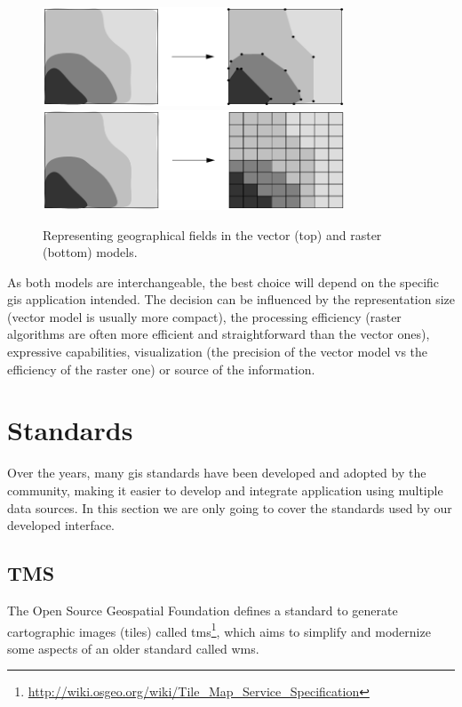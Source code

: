     \begin{figure}[ht]
		\begin{center}
			{\includegraphics[width=0.8\textwidth]{figures/field_vector.png}}
			{\includegraphics[width=0.8\textwidth]{figures/field_raster.png}}
		\end{center}
		\caption{Representing geographical fields in the vector (top) and raster (bottom) models.}
		\label{fig:gis:field}
	\end{figure}
    
    As both models are interchangeable, the best choice will depend on the specific \gls{gis} application intended. The decision can be influenced by the representation size (vector model is usually more compact), the processing efficiency (raster algorithms are often more efficient and straightforward than the vector ones), expressive capabilities, visualization (the precision of the vector model vs the efficiency of the raster one) or source of the information.
    
    \section{Standards}
    Over the years, many \gls{gis} standards have been developed and adopted by the community, making it easier to develop and integrate application using multiple data sources. In this section we are only going to cover the standards used by our developed interface.
    
    \subsection{TMS}
    The Open Source Geospatial Foundation defines a standard to generate cartographic images (tiles) called \gls{tms}\footnote{\url{http://wiki.osgeo.org/wiki/Tile_Map_Service_Specification}}, which aims to simplify and modernize some aspects of an older standard called \gls{wms}.
    
